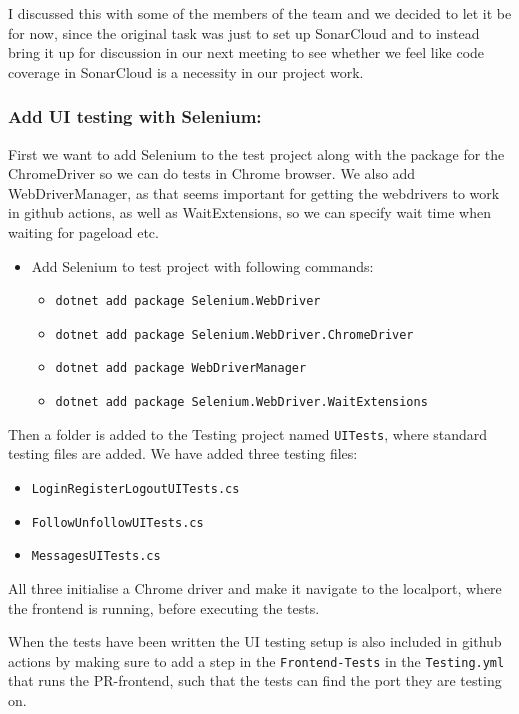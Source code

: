 I discussed this with some of the members of the team and we decided to let it be for now, since the original task was just to set up SonarCloud and to instead bring it up for discussion in our next meeting to see whether we feel like code coverage in SonarCloud is a necessity in our project work.

\subsubsection{Add UI testing with Selenium:}
\label{log:add-ui-testing-with-selenium}
First we want to add Selenium to the test project along with the package for the ChromeDriver so we can do tests in Chrome browser. We also add WebDriverManager, as that seems important for getting the webdrivers to work in github actions, as well as WaitExtensions, so we can specify wait time when waiting for pageload etc.

\begin{itemize}
    \item Add Selenium to test project with following commands:

    \begin{itemize}
        \item \texttt{dotnet\ add\ package\ Selenium.WebDriver}
        \item \texttt{dotnet\ add\ package\ Selenium.WebDriver.ChromeDriver}
        \item \texttt{dotnet\ add\ package\ WebDriverManager}
        \item \texttt{dotnet\ add\ package\ Selenium.WebDriver.WaitExtensions}
    \end{itemize}
\end{itemize}
Then a folder is added to the Testing project named \texttt{UITests}, where standard testing files are added.
We have added three testing files:

\begin{itemize}
    \item \texttt{LoginRegisterLogoutUITests.cs}
    \item \texttt{FollowUnfollowUITests.cs}
    \item \texttt{MessagesUITests.cs}
\end{itemize}
All three initialise a Chrome driver and make it navigate to the localport, where the frontend is running, before executing the tests.

When the tests have been written the UI testing setup is also included in github actions by making sure to add a step in the \texttt{Frontend-Tests} in the \texttt{Testing.yml} that runs the PR-frontend, such that the tests can find the port they are testing on.

